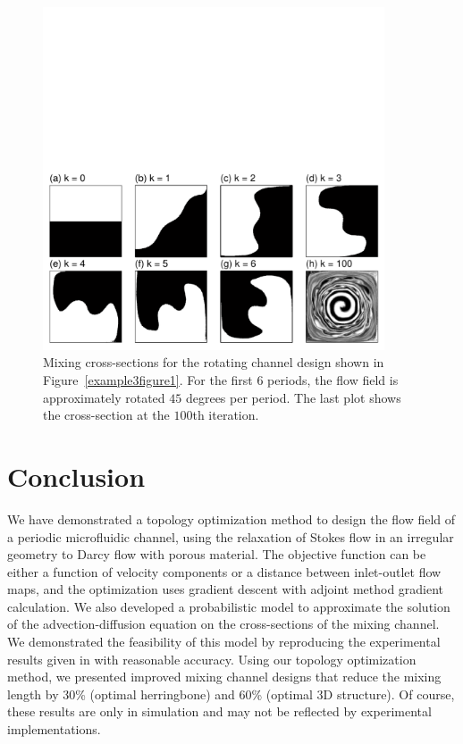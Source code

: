 \documentclass[times]{fldauth}
\begin{document}
\begin{figure}
  \centerline{
    \includegraphics[width=0.9\textwidth,trim=0.2cm 0.2cm 0.2cm 8.5cm,clip]{example3simu}}
  \caption{\label{example3figure2} Mixing cross-sections for the
    rotating channel design shown in Figure~\ref{example3figure1}. For
    the first $6$ periods, the flow field is approximately rotated
    $45$ degrees per period. The last plot shows the cross-section at
    the $100$th iteration.}
\end{figure}


%
%
\section{Conclusion}
\label{sec:topoptconclusion}

We have demonstrated a topology optimization method to design the flow
field of a periodic microfluidic channel, using the relaxation
\cite{Evgrafov2005, Borrvall2003} of Stokes flow in an irregular
geometry to Darcy flow with porous material. The objective function
can be either a function of velocity components or a distance between
inlet-outlet flow maps, and the optimization uses gradient descent
with adjoint method gradient calculation. We also developed a
probabilistic model to approximate the solution of the
advection-diffusion equation on the cross-sections of the mixing
channel. We demonstrated the feasibility of this model by reproducing
the experimental results given in \cite{Stroock2002} with reasonable
accuracy. Using our topology optimization method, we presented
improved mixing channel designs that reduce the mixing length by 30\%
(optimal herringbone) and 60\% (optimal 3D structure). Of course,
these results are only in simulation and may not be reflected by
experimental implementations.
\end{document}
